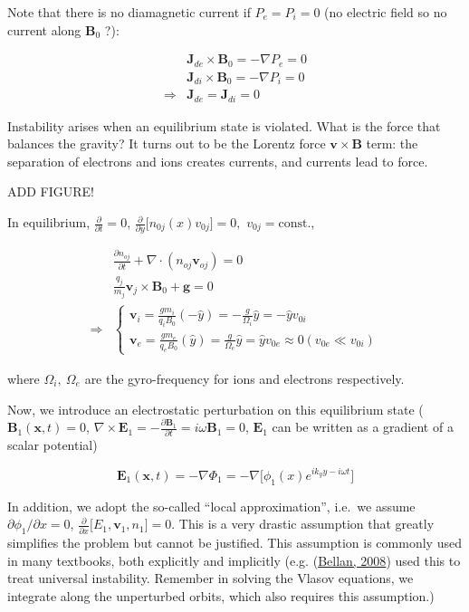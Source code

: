 \documentclass[
  notoc %
]{tufte-book}
\begin{document}
Note that there is no diamagnetic current if \(P_e=P_i=0\) (no electric
field so no current along \(\mathbf{B}_0\) ?):

\[
\begin{aligned}
&\mathbf{J}_{de}\times\mathbf{B}_0=-\nabla P_e=0 \\
&\mathbf{J}_{di}\times\mathbf{B}_0=-\nabla P_i=0 \\
\Rightarrow & \mathbf{J}_{de}=\mathbf{J}_{di}=0
\end{aligned}
\]

Instability arises when an equilibrium state is violated. What is the
force that balances the gravity? It turns out to be the Lorentz force
\(\mathbf{v}\times\mathbf{B}\) term: the separation of electrons and
ions creates currents, and currents lead to force.

ADD FIGURE!

In equilibrium, \(\frac{\partial}{\partial t}=0\),
\(\frac{\partial}{\partial y}\big[ n_{0j}(x)v_{0j} \big]=0,\)
\(v_{0j}=\text{const.}\),

\[
\begin{aligned}
&\frac{\partial{n_{oj}}}{{\partial t}}+\nabla\cdot(n_{oj}\mathbf{v}_{oj})=0 \\
&\frac{q_j}{m_j}\mathbf{v}_j\times\mathbf{B}_0+\mathbf{g}=0 \\
\Rightarrow &
\begin{cases}
\mathbf{v}_i=\frac{gm_i}{q_iB_0}(-\hat{y})=-\frac{g}{\Omega_i}\hat{y}=-\hat{y}v_{0i} \\
\mathbf{v}_e=\frac{gm_e}{q_eB_0}(\hat{y})=\frac{g}{\Omega_e}\hat{y}=\hat{y}v_{0e}\approx 0 (v_{0e}\ll v_{0i})
\end{cases}
\end{aligned}
\]

where \(\Omega_i,\ \Omega_e\) are the gyro-frequency for ions and
electrons respectively.

Now, we introduce an electrostatic perturbation on this equilibrium
state (\(\mathbf{B}_1(\mathbf{x},t)=0\),
\(\nabla\times\mathbf{E}_1=-\frac{\partial \mathbf{B}_1}{\partial t}=i\omega\mathbf{B}_1=0\),
\(\mathbf{E}_1\) can be written as a gradient of a scalar potential)

\[
\mathbf{E}_1(\mathbf{x},t)=-\nabla\Phi_1 = -\nabla\big[ \phi_1(x)e^{ik_y y-i\omega t} \big]
\]

In addition, we adopt the so-called ``local approximation'', i.e.~we
assume \(\partial \phi_1/\partial x=0\),
\(\frac{\partial}{\partial x}\big[ E_1,\mathbf{v}_1,n_1 \big]=0\). This
is a very drastic assumption that greatly simplifies the problem but
cannot be justified. This assumption is commonly used in many textbooks,
both explicitly and implicitly (e.g.
(\protect\hyperlink{ref-bellan2008fundamentals}{Bellan, 2008}) used this
to treat universal instability. Remember in solving the Vlasov
equations, we integrate along the unperturbed orbits, which also
requires this assumption.)
\end{document}
